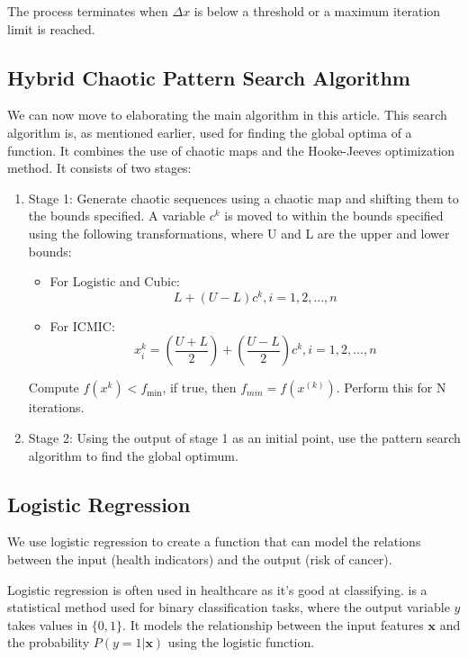 \documentclass[conference]{IEEEtran}
\begin{document}
The process terminates when \( \Delta x \) is below a threshold or a maximum iteration limit is reached.

\subsection{Hybrid Chaotic Pattern Search Algorithm}

We can now move to elaborating the main algorithm in this article. This search algorithm is, as mentioned earlier, used for finding the global optima of a function. It combines the use of chaotic maps and the Hooke-Jeeves optimization method. It consists of two stages:

\begin{enumerate}
  \item Stage 1: Generate chaotic sequences using a chaotic map and shifting them to the bounds specified. A variable $c^k$ is moved to within the bounds specified using the following transformations, where U and L are the upper and lower bounds:
        \begin{itemize}
        \item For Logistic and Cubic: \[L + (U - L)c^k, i = 1,2, \dots , n\]

        \item For ICMIC: \[x_i^k= (\frac{U+L}{2})+(\frac{U-L}{2})c^k, i = 1,2,\dots,n\]
        \end{itemize}

        Compute $f(x^{k})< f_{\text{min}}$, if true, then $f_{min} = f(x^{(k)})$. Perform this for N iterations.
\item Stage 2: Using the output of stage 1 as an initial point, use the pattern search algorithm to find the global optimum.
\end{enumerate}

\subsection{Logistic Regression}

We use logistic regression to create a function that can model the relations between the input (health indicators) and the output (risk of cancer).

Logistic regression is often used in healthcare as it's good at classifying\cite{liuResearchLogisticRegression2018}\cite{ayerComparisonLogisticRegression2010}\cite{demirChaoticOptimizationMethod2020}\cite{zhouCancerClassificationPrediction2004}. is a statistical method used for binary classification tasks, where the output variable \( y \) takes values in \( \{0, 1\} \). It models the relationship between the input features \( \mathbf{x} \) and the probability \( P(y=1|\mathbf{x}) \) using the logistic function.\cite{in}
\end{document}
